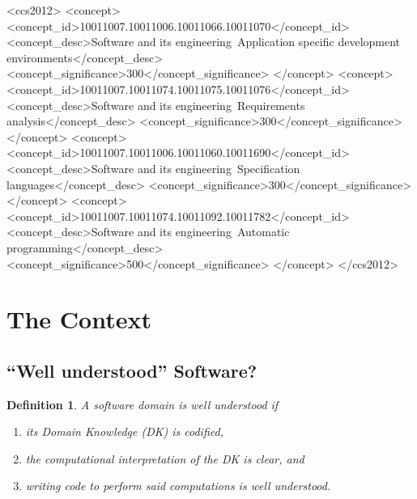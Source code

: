 \documentclass[sigconf,review,anonymous=false]{acmart}
\begin{document}
\begin{CCSXML}
<ccs2012>
   <concept>
       <concept_id>10011007.10011006.10011066.10011070</concept_id>
       <concept_desc>Software and its engineering~Application specific development environments</concept_desc>
       <concept_significance>300</concept_significance>
       </concept>
   <concept>
       <concept_id>10011007.10011074.10011075.10011076</concept_id>
       <concept_desc>Software and its engineering~Requirements analysis</concept_desc>
       <concept_significance>300</concept_significance>
       </concept>
   <concept>
       <concept_id>10011007.10011006.10011060.10011690</concept_id>
       <concept_desc>Software and its engineering~Specification languages</concept_desc>
       <concept_significance>300</concept_significance>
       </concept>
   <concept>
       <concept_id>10011007.10011074.10011092.10011782</concept_id>
       <concept_desc>Software and its engineering~Automatic programming</concept_desc>
       <concept_significance>500</concept_significance>
       </concept>
 </ccs2012>
\end{CCSXML}



\newtheorem{defn}{Definition}

\maketitle

\section{The Context}
\subsection{``Well understood'' Software?}\label{ch:wellUnderstood}

\begin{defn}
A software domain is \emph{well understood} if
\begin{enumerate}
\item its Domain Knowledge (DK) is codified,
\item the computational interpretation of the DK is clear, and
\item writing code to perform said computations is well understood.
\end{enumerate}
\end{defn}
\end{document}

